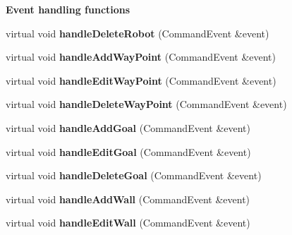 \begin{Indent}{\bf Event handling functions}
\begin{DoxyCompactItemize}
\item 
virtual void {\bfseries handle\+Delete\+Robot} (Command\+Event \&event)\hypertarget{class_view_1_1_robot_world_canvas_a0d1aeab78b87c7ac297fa877d63d4509}{}\label{class_view_1_1_robot_world_canvas_a0d1aeab78b87c7ac297fa877d63d4509}

\item 
virtual void {\bfseries handle\+Add\+Way\+Point} (Command\+Event \&event)\hypertarget{class_view_1_1_robot_world_canvas_a27d9c2435d11a4a25ba545b2dedb7942}{}\label{class_view_1_1_robot_world_canvas_a27d9c2435d11a4a25ba545b2dedb7942}

\item 
virtual void {\bfseries handle\+Edit\+Way\+Point} (Command\+Event \&event)\hypertarget{class_view_1_1_robot_world_canvas_a28b10cb19c0c0810c329f8730dd26da3}{}\label{class_view_1_1_robot_world_canvas_a28b10cb19c0c0810c329f8730dd26da3}

\item 
virtual void {\bfseries handle\+Delete\+Way\+Point} (Command\+Event \&event)\hypertarget{class_view_1_1_robot_world_canvas_a59a9e54e21bd5bd93bf67b8ea53776c0}{}\label{class_view_1_1_robot_world_canvas_a59a9e54e21bd5bd93bf67b8ea53776c0}

\item 
virtual void {\bfseries handle\+Add\+Goal} (Command\+Event \&event)\hypertarget{class_view_1_1_robot_world_canvas_aec6ff89595e1a7acc7d52617e7382a9d}{}\label{class_view_1_1_robot_world_canvas_aec6ff89595e1a7acc7d52617e7382a9d}

\item 
virtual void {\bfseries handle\+Edit\+Goal} (Command\+Event \&event)\hypertarget{class_view_1_1_robot_world_canvas_a02faf3e677c578a817e6c3e071c40fbd}{}\label{class_view_1_1_robot_world_canvas_a02faf3e677c578a817e6c3e071c40fbd}

\item 
virtual void {\bfseries handle\+Delete\+Goal} (Command\+Event \&event)\hypertarget{class_view_1_1_robot_world_canvas_a373e72f2cda977a78ef7c9dae4fea0e5}{}\label{class_view_1_1_robot_world_canvas_a373e72f2cda977a78ef7c9dae4fea0e5}

\item 
virtual void {\bfseries handle\+Add\+Wall} (Command\+Event \&event)\hypertarget{class_view_1_1_robot_world_canvas_aa95a5735508bdba10ee833be5b9d2052}{}\label{class_view_1_1_robot_world_canvas_aa95a5735508bdba10ee833be5b9d2052}

\item 
virtual void {\bfseries handle\+Edit\+Wall} (Command\+Event \&event)\hypertarget{class_view_1_1_robot_world_canvas_a6c69668363176d9e81579fef5e30ba9e}{}\label{class_view_1_1_robot_world_canvas_a6c69668363176d9e81579fef5e30ba9e}


\end{DoxyCompactItemize}
\end{Indent}
